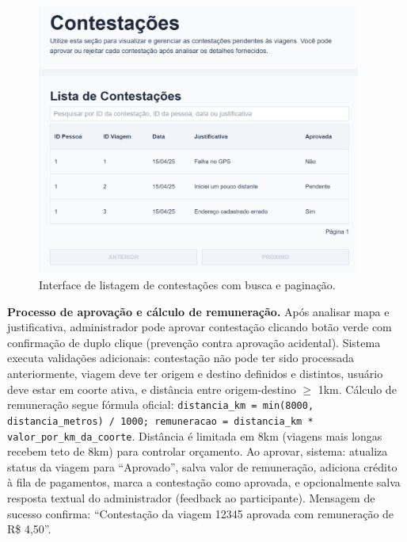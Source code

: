  \begin{figure}[H]
   \centering
   \includegraphics[width=0.95\textwidth]{figuras/contestacoes_listar.png}
   \caption{Interface de listagem de contestações com busca e paginação.}
   \label{fig:contestacoes_listagem}
 \end{figure}



\textbf{Processo de aprovação e cálculo de remuneração.} Após analisar mapa e justificativa, administrador pode aprovar contestação clicando botão verde com confirmação de duplo clique (prevenção contra aprovação acidental). Sistema executa validações adicionais: contestação não pode ter sido processada anteriormente, viagem deve ter origem e destino definidos e distintos, usuário deve estar em coorte ativa, e distância entre origem-destino $\geq$ 1km. Cálculo de remuneração segue fórmula oficial: \texttt{distancia\_km = min(8000, distancia\_metros) / 1000; remuneracao = distancia\_km * valor\_por\_km\_da\_coorte}. Distância é limitada em 8km (viagens mais longas recebem teto de 8km) para controlar orçamento. Ao aprovar, sistema: atualiza status da viagem para ``Aprovado'', salva valor de remuneração, adiciona crédito à fila de pagamentos, marca a contestação como aprovada, e opcionalmente salva resposta textual do administrador (feedback ao participante). Mensagem de sucesso confirma: ``Contestação da viagem 12345 aprovada com remuneração de R\$ 4,50''.

